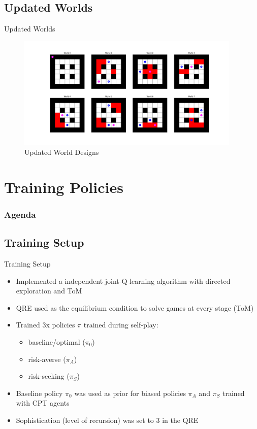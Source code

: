 \documentclass[aspectratio=1610, xcolor=dvipsnames]{packages/beamer}
\newcommand{\displayTOC}{\begin{frame}\frametitle{Agenda} \tableofcontents[currentsection, subsectionstyle=show/show/hide]\end{frame}}
\begin{document}
\subsection{Updated Worlds}
\begin{frame}{Updated Worlds}
    \begin{figure}
        \centering
        \includegraphics[width=0.95\textwidth]{../results/Fig_Worlds}
        \caption{Updated World Designs}
        \label{fig:Worlds}
    \end{figure}

\end{frame}
\section{Training Policies} \displayTOC



\subsection{Training Setup} \begin{frame}{Training Setup}
    \begin{itemize}
        \item Implemented a independent joint-Q learning algorithm with directed exploration and \ac{ToM}
        \item \Ac{QRE} used as the equilibrium condition to solve games at every stage (\ac{ToM})
        \item Trained 3x policies $\pi$ trained during self-play:
        \begin{itemize}
            \item baseline/optimal ($\pi_{0}$)
            \item risk-averse ($\pi_{A}$)
            \item risk-seeking ($\pi_{S}$)
        \end{itemize}
        \item Baseline policy $\pi_{0}$ was used as prior for biased policies $\pi_{A}$ and $\pi_{S}$ trained with \ac{CPT} agents
        \item Sophistication (level of recursion) was set to 3 in the \ac{QRE}
    \end{itemize}
\end{frame}
\end{document}
